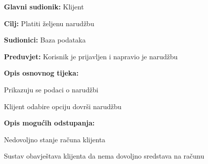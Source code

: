					
				\noindent {}
					\begin{packed_item}
	
						\item \textbf{Glavni sudionik: } Klijent
						\item  \textbf{Cilj:} Platiti željenu narudžbu
						\item  \textbf{Sudionici:} Baza podataka
						\item  \textbf{Preduvjet:} Korisnik je prijavljen i napravio je narudžbu
						\item  \textbf{Opis osnovnog tijeka:}
						
						\item[] \begin{packed_enum}
	
							\item Prikazuju se podaci o narudžbi
							\item Klijent odabire opciju dovrši narudžbu
						\end{packed_enum}
						
						\item  \textbf{Opis mogućih odstupanja:}
						
						\item[] \begin{packed_item}
	
							\item[-] Nedovoljno stanje računa klijenta
							\item[] \begin{packed_enum}
								
								\item Sustav obavještava klijenta da nema dovoljno sredstava na računu
								
							\end{packed_enum}
							
						\end{packed_item}
					\end{packed_item}
				
